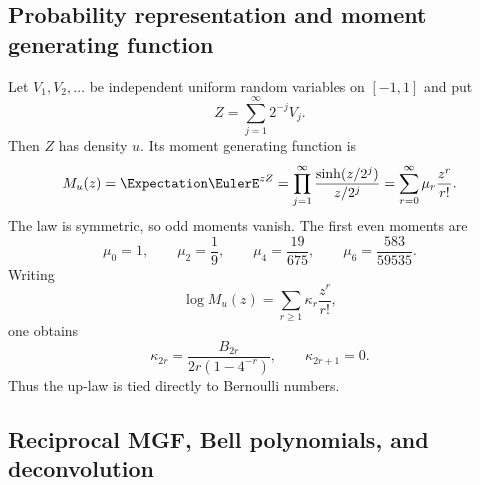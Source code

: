 \documentclass[11pt,oneside]{article}
\numberwithin{equation}{section}
\theoremstyle{definition}
\theoremstyle{remark}
\newcommand{\M}{M_u}
\begin{document}
\subsection{Probability representation and moment generating function}

Let $V_1,V_2,\ldots$ be independent uniform random variables on $[-1,1]$ and
put
\begin{equation}
 Z=\sum_{j=1}^{\infty}2^{-j}V_j.
 \label{eq:random-series}
\end{equation}
Then $Z$ has density $u$.  Its moment generating function is
\begin{equation}
 \M(z)=\Expectation\EulerE^{zZ}
 =\prod_{j=1}^{\infty}\frac{\sinh(z/2^j)}{z/2^j}
 =\sum_{r=0}^{\infty}\mu_r\frac{z^r}{r!}.
 \label{eq:mgf}
\end{equation}
The law is symmetric, so odd moments vanish.  The first even moments are
\begin{equation}
 \mu_0=1,\qquad \mu_2=\frac19,\qquad
 \mu_4=\frac{19}{675},\qquad
 \mu_6=\frac{583}{59535}.
 \label{eq:moments}
\end{equation}
Writing
\[
 \log\M(z)=\sum_{r\ge1}\kappa_r\frac{z^r}{r!},
\]
one obtains
\begin{equation}
 \kappa_{2r}=\frac{B_{2r}}{2r(1-4^{-r})},
 \qquad \kappa_{2r+1}=0.
 \label{eq:cumulants}
\end{equation}
Thus the up-law is tied directly to Bernoulli numbers.

\subsection{Reciprocal MGF, Bell polynomials, and deconvolution}
\end{document}
